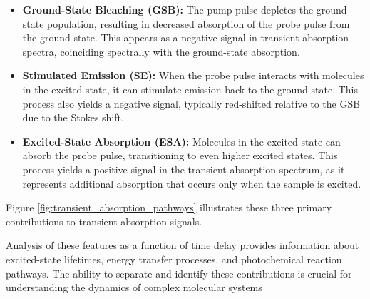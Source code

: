\begin{itemize}
	\item \textbf{Ground-State Bleaching (GSB):} The pump pulse depletes the ground state population, resulting in decreased absorption of the probe pulse from the ground state. This appears as a negative signal in transient absorption spectra, coinciding spectrally with the ground-state absorption.

	\item \textbf{Stimulated Emission (SE):} When the probe pulse interacts with molecules in the excited state, it can stimulate emission back to the ground state. This process also yields a negative signal, typically red-shifted relative to the GSB due to the Stokes shift.

	\item \textbf{Excited-State Absorption (ESA):} Molecules in the excited state can absorb the probe pulse, transitioning to even higher excited states. This process yields a positive signal in the transient absorption spectrum, as it represents additional absorption that occurs only when the sample is excited.
\end{itemize}


\noindent Figure \ref{fig:transient_absorption_pathways} illustrates these three primary contributions to transient absorption signals.

\noindent Analysis of these features as a function of time delay provides information about excited-state lifetimes, energy transfer processes, and photochemical reaction pathways. The ability to separate and identify these contributions is crucial for understanding the dynamics of complex molecular systems %


